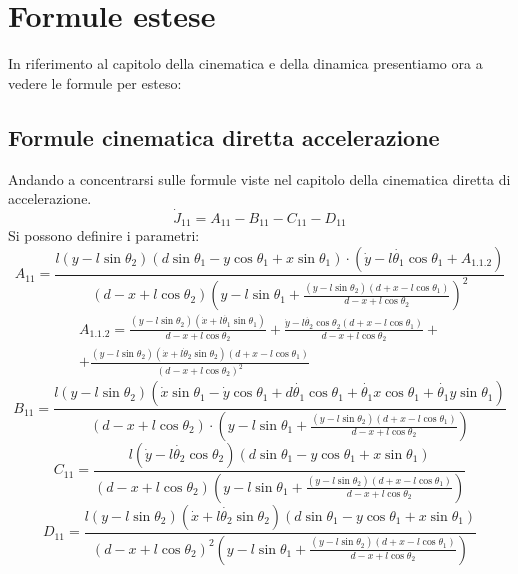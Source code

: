 \section{Formule estese}\label{Appendice:formule}
In riferimento al capitolo della cinematica e della dinamica presentiamo ora a vedere le formule per esteso:
\subsection{Formule cinematica diretta accelerazione}\label{Appendice:formuleCinematica}
Andando a concentrarsi sulle formule viste nel capitolo della cinematica diretta di accelerazione.
\begin{equation}
\dot{J}_{11} = A_{11} - B_{11} - C_{11} - D_{11}
\end{equation}
Si possono definire i parametri: 
\begin{equation*}
A_{11} = \frac{l(y-l\sin\theta_{2})(d\sin\theta_{1}-y\cos\theta _{1}+x\sin\theta _{1})\cdot (\dot{y}-l\dot{\theta_1}\cos\theta _{1}+A_{1.1.2})}{(d-x+l\cos\theta_{2})(y-l\sin\theta_{1}+\frac{(y-l\sin\theta _{2})(d+x-l\cos\theta _{1})}{d-x+l\cos\theta _{2}})^2}
\end{equation*}
\begin{equation*}
\begin{split}
A_{1.1.2} = \frac{(y-l\sin\theta_{2})(\dot{x}+l\dot{\theta_1}\sin\theta_{1})}{d-x+l\cos\theta_{2}}+\frac{\dot{y}-l\dot{\theta_2}\cos\theta_{2}(d+x-l\cos\theta_{1})}{d-x+l\cos\theta_{2}}+  \\
+ \frac{(y-l\sin\theta_{2})(\dot{x}+l\dot{\theta}_{2}\sin\theta_{2})(d+x-l\cos\theta_{1})}{{(d-x+l\cos\theta_{2})}^2}
\end{split}
\end{equation*}
\begin{equation*}
B_{11} =\frac{l(y-l\sin\theta_{2})(\dot{x}\sin\theta_{1}-\dot{y}\cos\theta_{1}+d\dot{\theta_1}\cos\theta_{1}+\dot{\theta_1}x\cos\theta_{1}+\dot{\theta_{1}}y\sin\theta _{1})}{(d-x+l\cos\theta_{2})\cdot(y-l\sin\theta_{1}+\frac{(y-l\sin\theta_{2})(d+x-l\cos\theta_{1})}{d-x+l\cos\theta_{2}})}
\end{equation*}
\begin{equation*}
C_{11} = \frac{l(\dot{y}-l\dot{\theta_{2}}\cos\theta_{2})(d\sin\theta_{1}
    -y\cos\theta_{1}+x\sin\theta_{1})}{(d-x+l\cos\theta_{2})(y-l\sin\theta_{1}+\frac{(y-l\sin\theta_{2})
    (d+x-l\cos\theta_{1})}{d-x+l\cos\theta_{2}})}
\end{equation*}
\begin{equation*}
D_{11} = \frac{l(y-l\sin\theta_{2})(\dot{x}+l\dot{\theta_2}\sin\theta_{2})
    (d\sin\theta_{1}-y\cos\theta_{1}+x\sin\theta_{1})}{(d-x+l\cos\theta_{2})^2(y-l\sin\theta_{1}+\frac{(y-l\sin\theta_{2})
    (d+x-l\cos\theta_{1})}{d-x+l\cos\theta _{2}})}
\end{equation*}
